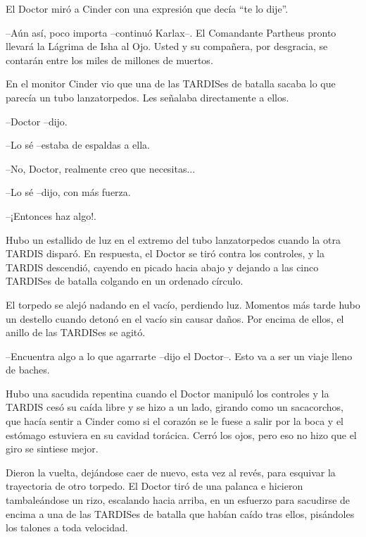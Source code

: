 El Doctor miró a Cinder con una expresión que decía ``te lo dije''.



--Aún así, poco importa --continuó Karlax--. El Comandante Partheus pronto llevará la Lágrima de Isha al Ojo. Usted y su compañera, por desgracia, se contarán entre los miles de millones de muertos.



En el monitor Cinder vio que una de las TARDISes de batalla sacaba lo que parecía un tubo lanzatorpedos. Les señalaba directamente a ellos. 



--Doctor --dijo.

--Lo sé --estaba de espaldas a ella.

--No, Doctor, realmente creo que necesitas...

--Lo sé --dijo, con más fuerza.

--¡Entonces haz algo!.



Hubo un estallido de luz en el extremo del tubo lanzatorpedos cuando la otra TARDIS disparó. En respuesta, el Doctor se tiró contra los controles, y la TARDIS descendió, cayendo en picado hacia abajo y dejando a las cinco TARDISes de batalla colgando en un ordenado círculo.

El torpedo se alejó nadando en el vacío, perdiendo luz. Momentos más tarde hubo un destello cuando detonó en el vacío sin causar daños. Por encima de ellos, el anillo de las TARDISes se agitó.



--Encuentra algo a lo que agarrarte --dijo el Doctor--. Esto va a ser un viaje lleno de baches.



Hubo una sacudida repentina cuando el Doctor manipuló los controles y la TARDIS cesó su caída libre y se hizo a un lado, girando como un sacacorchos, que hacía sentir a Cinder como si el corazón se le fuese a salir por la boca y el estómago estuviera en su cavidad torácica. Cerró los ojos, pero eso no hizo que el giro se sintiese mejor.

Dieron la vuelta, dejándose caer de nuevo, esta vez al revés, para esquivar la trayectoria de otro torpedo. El Doctor tiró de una palanca e hicieron tambaleándose un rizo, escalando hacia arriba, en un esfuerzo para sacudirse de encima a una de las TARDISes de batalla que habían caído tras ellos, pisándoles los talones a toda velocidad.



